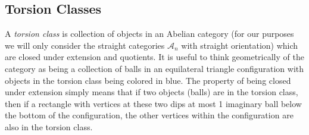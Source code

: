\documentclass{article}
\begin{document}
\subsection{Torsion Classes}
\begin{define}
A {\it torsion class} is collection of objects in an Abelian category (for our purposes we will only consider the straight categories $\mathcal{A}_n$ with straight orientation) which are closed under extension and quotients. It is useful to think geometrically of the category as being a collection of balls in an equilateral triangle configuration with objects in the torsion class being colored in blue. The property of being closed under extension simply means that if two objects (balls) are in the torsion class, then if a rectangle with vertices at these two dips at most 1 imaginary ball below the bottom of the configuration, the other vertices within the configuration are also in the torsion class.\\
 \end{define}
 \\
\begin{center}
\end{center}
\end{document}
